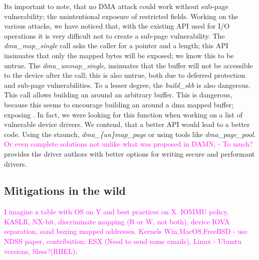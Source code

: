 Its important to note, that no DMA attack could work without sub-page vulnerability; the unintentional exposure of restricted fields. Working on the various attacks, we have noticed that, with the existing API used for I/O operations it is very difficult not to create a sub-page vulnerability. The \textit{dma\_map\_single} call asks the caller for a pointer and a length; this API insinuates that only the mapped bytes will be exposed; we know this to be untrue. The \textit{dma\_unmap\_single}, insinuates that the buffer will not be accessible to the device after the call; this is also untrue, both due to deferred protection and sub-page vulnerabilities. To a lesser degree, the \textit{build\_skb} is also dangerous. This call allows building an \skb around an arbitrary buffer. This is dangerous, because this seems to encourage building an \skb around a dma mapped buffer; exposing \shinfo. In fact, we were looking for this function when working on a list of vulnerable device drivers. We contend, that a better API would lead to a better code. Using the staunch, \textit{dma\_\{un\}map\_page} or using tools like \textit{dma\_page\_pool}. \textcolor{magenta}{Or even complete solutions not unlike what was proposed in DAMN\cite{MSMT18,MMT16}; - To much?} provides the driver authors with better options for writing secure and performant drivers. 

\subsection{Mitigations in the wild}
\textcolor{magenta}{I imagine a table with OS on Y and best practices on X.
IOMMU policy, KASLR, NX-bit, discriminate mapping (R or W, not both), device IOVA separation, sand boxing mapped addresses.
Kernels Win,MacOS,FreeBSD - use NDSS paper, contribution: ESX (Need to send some emails), Linux - Ubuntu versions, Sless?(RHEL)}.